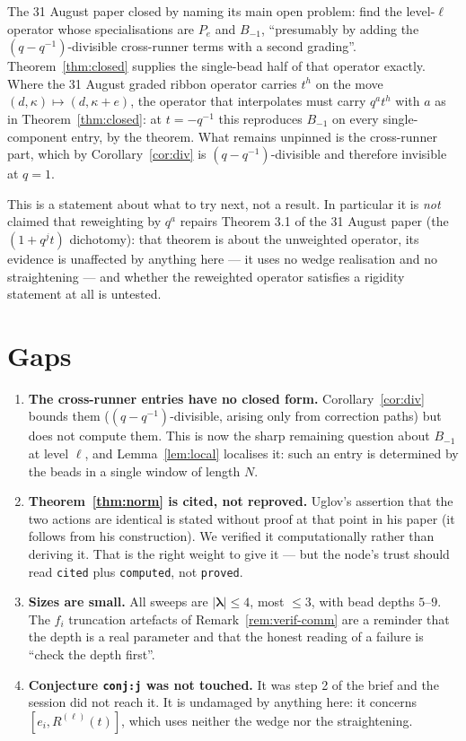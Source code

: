 \documentclass[11pt]{article}
\theoremstyle{definition}
\theoremstyle{remark}
\newcommand{\bl}{\boldsymbol{\lambda}}
\begin{document}
The 31 August paper closed by naming its main open problem: find the level-$\ell$ operator
whose specialisations are $P_e$ and $B_{-1}$, ``presumably by adding the
$(q-q^{-1})$-divisible cross-runner terms with a second grading''. Theorem~\ref{thm:closed}
supplies the single-bead half of that operator exactly. Where the 31 August graded ribbon
operator carries $t^{h}$ on the move $(d,\kappa)\mapsto(d,\kappa+e)$, the operator that
interpolates must carry $q^{a}t^{h}$ with $a$ as in Theorem~\ref{thm:closed}: at $t=-q^{-1}$
this reproduces $B_{-1}$ on every single-component entry, by the theorem. What remains
unpinned is the cross-runner part, which by Corollary~\ref{cor:div} is $(q-q^{-1})$-divisible
and therefore invisible at $q=1$.

This is a statement about what to try next, not a result. In particular it is \emph{not}
claimed that reweighting by $q^{a}$ repairs Theorem 3.1 of the 31 August paper (the
$(1+q^{j}t)$ dichotomy): that theorem is about the unweighted operator, its evidence is
unaffected by anything here --- it uses no wedge realisation and no straightening --- and
whether the reweighted operator satisfies a rigidity statement at all is untested.

\section{Gaps}\label{sec:gaps}

\begin{enumerate}
\item \textbf{The cross-runner entries have no closed form.} Corollary~\ref{cor:div}
bounds them ($(q-q^{-1})$-divisible, arising only from correction paths) but does not
compute them. This is now the sharp remaining question about $B_{-1}$ at level $\ell$, and
Lemma~\ref{lem:local} localises it: such an entry is determined by the beads in a single
window of length $N$.

\item \textbf{Theorem~\ref{thm:norm} is cited, not reproved.} Uglov's assertion that the
two actions are identical is stated without proof at that point in his paper (it follows
from his construction). We verified it computationally rather than deriving it. That is
the right weight to give it --- but the node's trust should read \texttt{cited} plus
\texttt{computed}, not \texttt{proved}.

\item \textbf{Sizes are small.} All sweeps are $|\bl|\le4$, most $\le3$, with bead depths
$5$--$9$. The $f_i$ truncation artefacts of Remark~\ref{rem:verif-comm} are a reminder
that the depth is a real parameter and that the honest reading of a failure is
``check the depth first''.

\item \textbf{Conjecture \texttt{conj:j} was not touched.} It was step 2 of the brief and
the session did not reach it. It is undamaged by anything here: it concerns
$[e_i,R^{(\ell)}(t)]$, which uses neither the wedge nor the straightening.
\end{enumerate}
\end{document}
